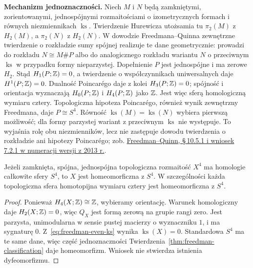 {
\noindent\textbf{Mechanizm jednoznaczności.}
Niech $M$ i $N$ będą zamkniętymi, zorientowanymi,
jednospójnymi rozmaitościami o izometrycznych
formach i równych niezmiennikach $\operatorname{ks}$.
Twierdzenie Hurewicza utożsamia tu $\pi_2(M)$
z $H_2(M)$, a $\pi_2(N)$ z $H_2(N)$.
W dowodzie Freedmana--Quinna zewnętrzne
twierdzenie o rozkładzie sumy spójnej realizuje
te dane geometrycznie: prowadzi do rozkładu
$N\cong M\#P$ albo do analogicznego rozkładu
wariantu $N$ o przeciwnym $\operatorname{ks}$
w przypadku formy nieparzystej. Dopełnienie $P$
jest jednospójne i ma zerowe $H_2$. Stąd
$H_1(P;\mathbb{Z})=0$, a twierdzenie o współczynnikach
uniwersalnych daje $H^1(P;\mathbb{Z})=0$.
Dualność Poincarégo daje z kolei $H_3(P;\mathbb{Z})=0$;
spójność i orientacja wyznaczają $H_0(P;\mathbb{Z})$
i $H_4(P;\mathbb{Z})$ jako $\mathbb{Z}$. Jest więc sferą
homologiczną wymiaru cztery. Topologiczna hipoteza Poincarégo,
również wynik zewnętrzny Freedmana, daje
$P\cong S^4$. Równość $\operatorname{ks}(M)
=\operatorname{ks}(N)$ wybiera pierwszą możliwość;
dla formy parzystej wariant z przeciwnym
$\operatorname{ks}$ nie występuje. To wyjaśnia
rolę obu niezmienników, lecz nie zastępuje dowodu
twierdzenia o rozkładzie ani hipotezy Poincarégo;
zob. \href{https://archive.mpim-bonn.mpg.de/4789/2/FreedmanQuinn-TopologyOf4Manifolds-Reformatted2013.pdf}
{Freedman--Quinn, \S\,10.5.1 i wniosek 7.2.1
w numeracji wersji z 2013 r.}.
\par}

\begin{wniosek}
\label{cor:freedman-poincare-4}
Jeżeli zamknięta, spójna, jednospójna topologiczna
rozmaitość $X^4$ ma homologie całkowite sfery $S^4$,
to $X$ jest homeomorficzna z $S^4$.
W szczególności każda topologiczna sfera homotopijna
wymiaru cztery jest homeomorficzna z $S^4$.
\end{wniosek}
\begin{proof}
Ponieważ $H_4(X;\mathbb{Z})\cong\mathbb{Z}$, wybieramy orientację.
Warunek homologiczny daje $H_2(X;\mathbb{Z})=0$, więc
$Q_X$ jest formą zerową na grupie rangi zero.
Jest parzysta, unimodularna w sensie pustej macierzy
o wyznaczniku $1$, i ma sygnaturę $0$.
Z~\eqref{eq:freedman-even-ks} wynika
$\operatorname{ks}(X)=0$. Standardowa $S^4$
ma te same dane, więc część jednoznaczności
Twierdzenia~\ref{thm:freedman-classification}
daje homeomorfizm. Wniosek nie stwierdza
istnienia dyfeomorfizmu.
\end{proof}

